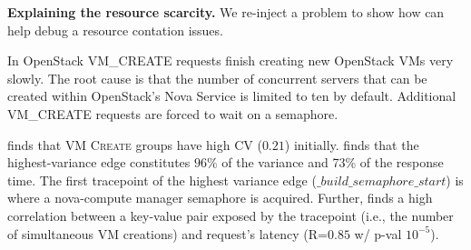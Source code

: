 \noindent\textbf{Explaining the resource scarcity.}  
We re-inject a problem to show how \staif{} can help debug a resource contation issues.

In OpenStack \textsc{VM\_CREATE} requests finish creating new OpenStack VMs very slowly. 
The root cause is that the
number of concurrent servers that can be created within OpenStack's Nova Service is limited to ten by default. 
Additional \textsc{VM\_CREATE} requests are forced to wait on a semaphore.


\staif{} finds that \textsc{VM Create} groups have high CV ($0.21$) initially.
\staif{} finds that the highest-variance edge constitutes
$96\%$ of the variance and 73\% of the response time.  The first
tracepoint of the highest variance edge ($\_build\_semaphore\_start$)
is where a nova-compute manager semaphore is acquired.
Further, \staif{} finds a high correlation between a key-value pair
exposed by the tracepoint (i.e., the number of simultaneous VM
creations) and request's latency (R=$0.85$ w/ p-val $10^{-5}$).